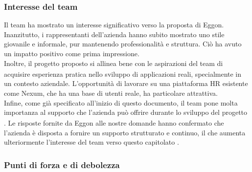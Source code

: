 \documentclass[a4paper,11pt]{article}
\begin{document}
\subsubsection{Interesse del team}
\parbox[t]{\linewidth}{%
Il team ha mostrato un interesse significativo verso la proposta di Eggon. Inanzitutto, i rappresentanti dell'azienda hanno subito mostrato uno stile giovanile e informale, pur mantenendo professionalità e struttura. Ciò ha avuto un impatto positivo come prima impressione. \\Inoltre, il progetto\textsubscript{}
 proposto si allinea bene con le aspirazioni del team di acquisire esperienza pratica nello sviluppo di applicazioni reali, specialmente in un contesto aziendale. L'opportunità di lavorare su una piattaforma HR esistente come Nexum, che ha una base di utenti reale, ha particolare attrattiva.\\ Infine, come già specificato all'inizio di questo documento, il team pone molta importanza al supporto che l'azienda può offrire durante lo sviluppo del progetto\textsubscript{}
. Le risposte fornite da Eggon alle nostre domande hanno confermato che l'azienda è disposta a fornire un supporto strutturato e continuo, il che aumenta ulteriormente l'interesse del team verso questo capitolato\textsubscript{}
.
}
\newpage
\subsubsection{Punti di forza e di debolezza}
\end{document}
